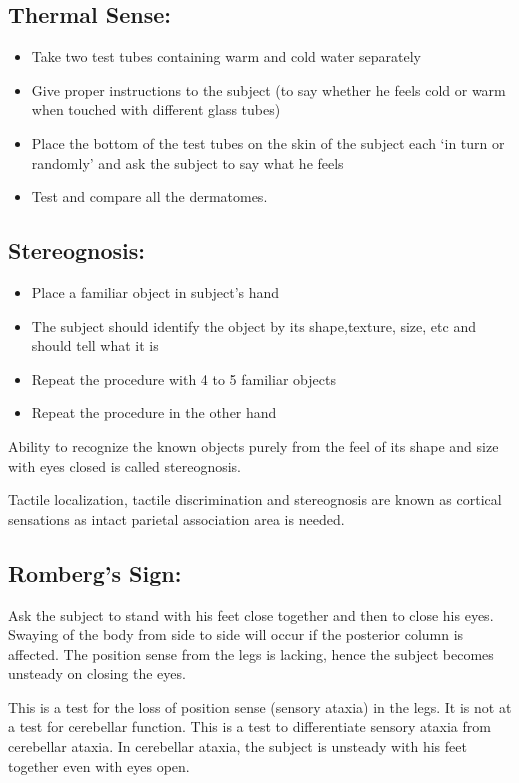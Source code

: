 \documentclass[a4paper,12pt,openany,oneside]{book}
\begin{document}
	\subsection*{Thermal Sense:}
	\begin{itemize}
\item{Take two test tubes containing warm and cold water separately}
\item{Give proper instructions to the subject (to say whether he feels cold or warm when touched with different glass tubes)}
\item{Place the bottom of the test tubes on the skin of the subject each ‘in turn or randomly’ and ask the subject to say what he feels}
\item{Test and compare all the dermatomes.}
	\end{itemize}
	\subsection*{Stereognosis:}
\begin{itemize}
\item{Place a familiar object in subject’s hand}
\item{The subject should identify the object by its shape,texture, size, etc and should tell what it is}
\item{Repeat the procedure with 4 to 5 familiar objects}
\item{Repeat the procedure in the other hand}
	\end{itemize}
	\par
	Ability to recognize the known objects purely from the feel of its shape and size with eyes closed is called stereognosis.
	\par
	Tactile localization, tactile discrimination and stereognosis are known as cortical sensations as intact parietal association area is needed.
\subsection*{Romberg’s Sign:}
\par
	Ask the subject to stand with his feet close together and then to close his eyes. Swaying of the body from side to side will occur if the posterior column is affected. The position sense from the legs is lacking, hence the subject becomes unsteady on closing the eyes.
	\par
	This is a test for the loss of position sense (sensory ataxia) in the legs. It is not at a test for cerebellar function. This is a test to differentiate sensory ataxia from cerebellar ataxia. In cerebellar ataxia, the subject is unsteady with his feet together even with eyes open.
\end{document}
